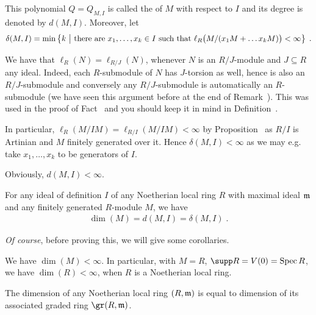\documentclass[a4paper,parskip=half,numbers=enddot, DIV=12]{scrreprt}
\begin{document}
\begin{defi}
    This polynomial $Q=Q_{M,I}$ is called the  of $M$ with respect to $I$ and its degree is denoted by $d(M,I)$. Moreover, let 
    \begin{align*}
        \delta(M,I) = \min\left\{k \ \middle|\  \text{there are }x_1,\ldots,x_k\in I \text{ such that } \ell_R\big(M/(x_1M+\ldots x_k M)\big)<\infty\right\}\;.
    \end{align*}
\end{defi}
\begin{rem*}
    \begin{alphanumerate}
    \item 
        We have that $\ell_R(N) = \ell_{R/J}(N)$, whenever $N$ is an $R/J$-module and $J\subseteq R$ any ideal. Indeed, each $R$-submodule of $N$ has $J$-torsion as well, hence is also an $R/J$-submodule and conversely any $R/J$-submodule is automatically an $R$-submodule (we have seen this argument before at the end of Remark~). This was used in the proof of Fact~ and you should keep it in mind in Definition~.
     \item   
         In particular, $\ell_R(M/IM)=\ell_{R/I}(M/IM) < \infty$ by Proposition~ as $R/I$ is Artinian and $M$ finitely generated over it. Hence $\delta(M,I) < \infty$ as we may e.g. take $x_1,\ldots, x_k$ to be generators of $I$.
    \item 
        Obviously, $d(M,I)<\infty$.
    \end{alphanumerate}
\end{rem*}
\begin{thm}
    For any ideal of definition $I$ of any Noetherian local ring $R$ with maximal ideal $\mathfrak{m}$ and any finitely generated $R$-module $M$, we have 
    \begin{align*}
    	\dim (M) = d(M,I) = \delta(M,I)\;.
    \end{align*}    
\end{thm}
\emph{Of course}, before proving this, we will give some corollaries.
\begin{cor}
    We have $\dim(M) <\infty$. In particular, with $M=R$, $\supp R= V(0) = \Spec R$, we have $\dim(R)<\infty$, when $R$ is a Noetherian local ring.
\end{cor}
\begin{cor}
    The dimension of any Noetherian local ring $(R,\mathfrak{m})$ is equal to dimension of its associated graded ring $\gr(R,\mm)$.
\end{cor}
\end{document}
